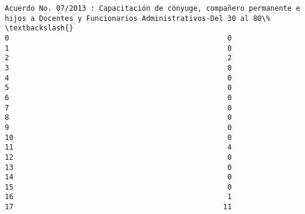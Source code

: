 \documentclass[11pt]{article}
\begin{document}
\begin{Verbatim}[commandchars=\\\{\}]
    Acuerdo No. 07/2013 : Capacitación de cónyuge, compañero permanente e hijos a Docentes y Funcionarios Administrativos-Del 30 al 80\%   \textbackslash{}
0                                                   0                                                                                      
1                                                   0                                                                                      
2                                                   2                                                                                      
3                                                   0                                                                                      
4                                                   0                                                                                      
5                                                   0                                                                                      
6                                                   0                                                                                      
7                                                   0                                                                                      
8                                                   0                                                                                      
9                                                   0                                                                                      
10                                                  0                                                                                      
11                                                  4                                                                                      
12                                                  0                                                                                      
13                                                  0                                                                                      
14                                                  0                                                                                      
15                                                  0                                                                                      
16                                                  1                                                                                      
17                                                 11                                                                                      

\end{Verbatim}
\end{document}
